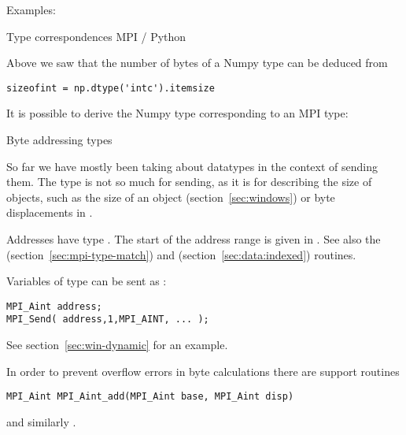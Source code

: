 Examples:



 {Type correspondences MPI / Python}

Above we saw that the number of bytes of a Numpy type can be deduced from
\lstset{language=Python}
\begin{lstlisting}
sizeofint = np.dtype('intc').itemsize  
\end{lstlisting}

It is possible to derive the Numpy type corresponding to an MPI type:

\lstset{language=C}

 {Byte addressing types}
\label{sec:mpi-byte-type}

So far we have mostly been taking about datatypes in the context of
sending them. The  type is not so much for
sending, as it is for describing the size of objects, such as the size
of an  object (section~\ref{sec:windows})
or byte displacements in .

Addresses have type . The start of the address range is
given in .
See also the 
(section~\ref{sec:mpi-type-match})
and
(section~\ref{sec:data:indexed})
routines.

Variables of type  can be sent as :
\begin{lstlisting}
MPI_Aint address;
MPI_Send( address,1,MPI_AINT, ... );
\end{lstlisting}
See section~\ref{sec:win-dynamic} for an example.

In order to prevent overflow errors in byte calculations
there are support routines 
\begin{lstlisting}
MPI_Aint MPI_Aint_add(MPI_Aint base, MPI_Aint disp)
\end{lstlisting}
and similarly .

